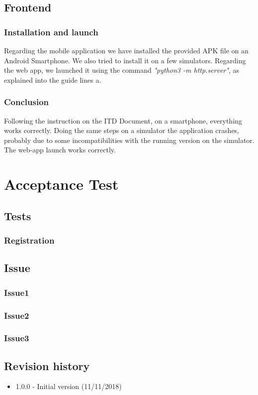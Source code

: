 \documentclass{article}
\begin{document}
\newpage	
\subsection{Frontend}
\subsubsection{Installation and launch}
Regarding the mobile application we have installed the provided APK file on an Android Smartphone. We also tried to install it on a few simulators.\newline
Regarding the web app, we launched it using the command \textit{"python3 -m http.server"}, as explained into the guide lines a.
\subsubsection{Conclusion}
Following the instruction on the ITD Document, on a smartphone, everything works correctly.
Doing the same steps on a simulator the application crashes, probably due to some incompatibilities with the running version on the simulator.	\newline
The web-app launch works correctly.
\newpage
\section{Acceptance Test}
\subsection{Tests}
\subsubsection{Registration}
\subsection{Issue}
\subsubsection{Issue1}
\subsubsection{Issue2}
\subsubsection{Issue3}


\subsection{Revision history}
\begin{itemize}
	\item 1.0.0 - Initial version (11/11/2018)

\end{itemize}
\end{document}

